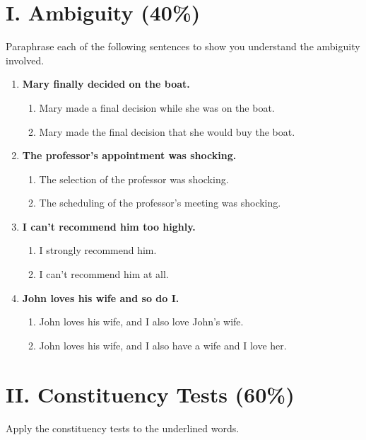 \documentclass[12pt]{article}
\begin{document}
\section*{I. Ambiguity (40\%)}

\noindent Paraphrase each of the following sentences to show you understand the ambiguity involved.

\begin{enumerate}
   \item \textbf{Mary finally decided on the boat.}
   \begin{enumerate}
       \item Mary made a final decision while she was on the boat.
       \item Mary made the final decision that she would buy the boat.
   \end{enumerate}

   \item \textbf{The professor's appointment was shocking.}
   \begin{enumerate}
       \item The selection of the professor was shocking.
       \item The scheduling of the professor's meeting was shocking.
   \end{enumerate}

   \item \textbf{I can't recommend him too highly.}
   \begin{enumerate}
       \item I strongly recommend him.
       \item I can't recommend him at all.
   \end{enumerate}

   \item \textbf{John loves his wife and so do I.}
   \begin{enumerate}
       \item John loves his wife, and I also love John's wife.
       \item John loves his wife, and I also have a wife and I love her.
   \end{enumerate}
\end{enumerate}

\section*{II. Constituency Tests (60\%)}

\noindent Apply the constituency tests to the underlined words.
\end{document}
